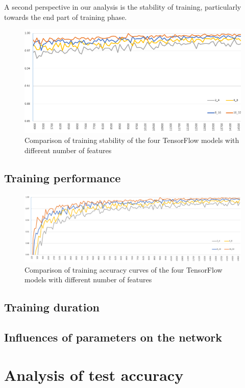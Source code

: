 A second perspective in our analysis is the stability of training, particularly towards the end part of training phase. 

\begin{figure}
	\caption{Comparison of training stability of the four TensorFlow models with different number of features}
	\label{fig:training_stability}
	\centering
	\includegraphics[width=1\textwidth]{Images/training_stability}
\end{figure}

\subsection{Training performance}

\begin{landscape}
	\begin{figure}
		\centering
		\caption{Comparison of training accuracy curves of the four TensorFlow models with different number of features}
		\label{fig:cfr_all}
		\includegraphics[width=1\textheight]{Images/cfr_all}
	\end{figure}
\end{landscape}

\subsection{Training duration}

\subsection{Influences of parameters on the network}

\section{Analysis of test accuracy}